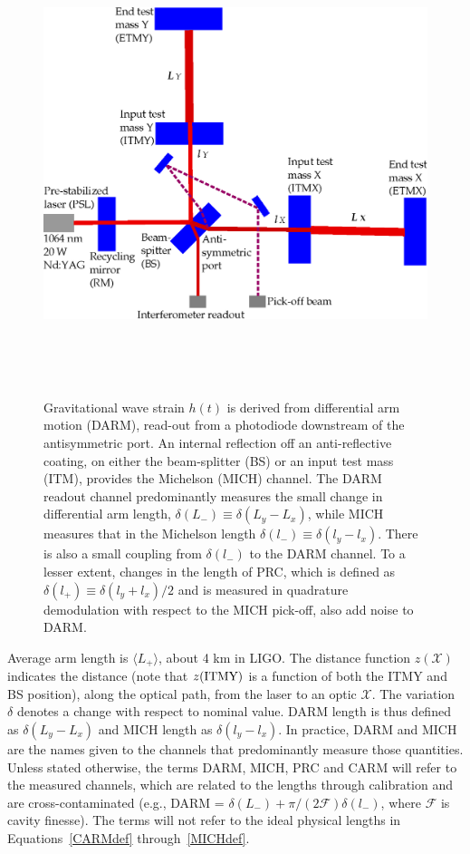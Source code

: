 \begin{figure}
\begin{center}
\includegraphics[height=135mm,width=150mm]{figure1.eps}
\caption{Gravitational wave strain $h(t)$ is derived from differential arm motion (DARM), read-out from a photodiode downstream of the antisymmetric port. An internal reflection off an anti-reflective coating, on either the beam-splitter (BS) or an input test mass (ITM), provides the Michelson (MICH) channel. The DARM readout channel predominantly measures the small change in differential arm length, $\delta(L_-) \equiv \delta(L_y - L_x)$, while MICH measures that in the Michelson length $\delta(l_-) \equiv \delta(l_y - l_x)$. There is also a small coupling from $\delta(l_-)$ to the DARM channel. To a lesser extent, changes in the length of PRC, which is defined as $\delta(l_+) \equiv \delta(l_y + l_x)/2$ and is measured in quadrature demodulation with respect to the MICH pick-off, also add noise to DARM.}
\label{arms}
\end{center}
\end{figure}


        Average arm length is $\langle L_+\rangle$, about 4 km in LIGO. The distance function $z(\mathcal{X})$ indicates the distance (note that $z(\textup{ITMY})$ is a function of both the ITMY and BS position), along the optical path, from the laser to an optic $\mathcal{X}$. The variation $\delta$ denotes a change with respect to nominal value. DARM length is thus defined as $\delta(L_y - L_x)$ and MICH length as $\delta(l_y - l_x)$. In practice, DARM and MICH are the names given to the channels that predominantly measure those quantities. Unless stated otherwise, the terms DARM, MICH, PRC and CARM will refer to the measured channels, which are related to the lengths through calibration and are cross-contaminated (e.g., DARM = $\delta(L_{-}) + \pi/(2 \mathcal{F}) \delta(l_{-})$, where $\mathcal{F}$ is cavity finesse). The terms will not refer to the ideal physical lengths in Equations~\ref{CARMdef} through~\ref{MICHdef}. 

